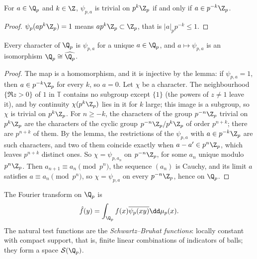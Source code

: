 \begin{lemma}\label{lem:psiperp}
For $a\in\Q_p$ and $k\in\Z$, $\psi_{p,a}$ is trivial on $p^k\Z_p$ if and only if $a\in p^{-k}\Z_p$.
\end{lemma}
\begin{proof}
$\psi_p(ap^k\Z_p)=1$ means $ap^k\Z_p\subset\Z_p$, that is $|a|_pp^{-k}\le1$.
\end{proof}

\begin{theorem}\label{thm:qpselfdual}
Every character of $\Q_p$ is $\psi_{p,a}$ for a unique $a\in\Q_p$, and $a\mapsto\psi_{p,a}$ is an isomorphism $\Q_p\cong\widehat{\Q_p}$.
\end{theorem}
\begin{proof}
The map is a homomorphism, and it is injective by the lemma: if $\psi_{p,a}=1$, then $a\in p^{-k}\Z_p$ for every $k$, so $a=0$. Let $\chi$ be a character. The
neighbourhood $\{\Re z>0\}$ of $1$ in $\mathbb T$ contains no subgroup except $\{1\}$ (the powers of $z\ne1$ leave it), and by continuity $\chi(p^k\Z_p)$ lies in it for $k$ large; this
image is a subgroup, so $\chi$ is trivial on $p^k\Z_p$. For $n\ge-k$, the characters of the group $p^{-n}\Z_p$ trivial on $p^k\Z_p$ are the characters of the cyclic
group $p^{-n}\Z_p/p^k\Z_p$ of order $p^{n+k}$; there are $p^{n+k}$ of them. By the lemma, the restrictions of the $\psi_{p,a}$ with $a\in p^{-k}\Z_p$ are such characters, and two
of them coincide exactly when $a-a'\in p^n\Z_p$, which leaves $p^{n+k}$ distinct ones. So $\chi=\psi_{p,a_n}$ on $p^{-n}\Z_p$, for some $a_n$ unique modulo $p^n\Z_p$. Then
$a_{n+1}\equiv a_n\pmod{p^n}$, the sequence $(a_n)$ is Cauchy, and its limit $a$ satisfies $a\equiv a_n\pmod{p^n}$, so $\chi=\psi_{p,a}$ on every $p^{-n}\Z_p$, hence on $\Q_p$.
\end{proof}

The Fourier transform on $\Q_p$ is
\[\hat f(y)=\int_{\Q_p}f(x)\overline{\psi_p(xy)}\dd\mu_p(x).\]
The natural test functions are the \emph{Schwartz--Bruhat functions}: locally constant with compact
support, that is, finite linear combinations of indicators of balls; they form a space $\mathcal S(\Q_p)$.

